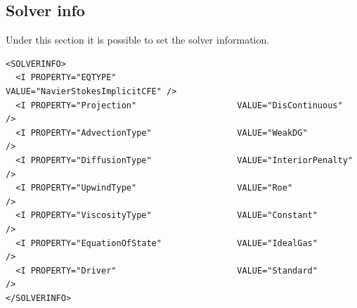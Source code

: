 \subsection*{Solver info}
Under this section it is possible to set the solver information.
\begin{lstlisting}[style=XmlStyle]
<SOLVERINFO>
  <I PROPERTY="EQTYPE"                        VALUE="NavierStokesImplicitCFE" />
  <I PROPERTY="Projection"                    VALUE="DisContinuous"           />
  <I PROPERTY="AdvectionType"                 VALUE="WeakDG"                  />
  <I PROPERTY="DiffusionType"                 VALUE="InteriorPenalty"         />
  <I PROPERTY="UpwindType"                    VALUE="Roe"                     />
  <I PROPERTY="ViscosityType"                 VALUE="Constant"                />
  <I PROPERTY="EquationOfState"               VALUE="IdealGas"                />
  <I PROPERTY="Driver"                        VALUE="Standard"                />
</SOLVERINFO>
\end{lstlisting}
